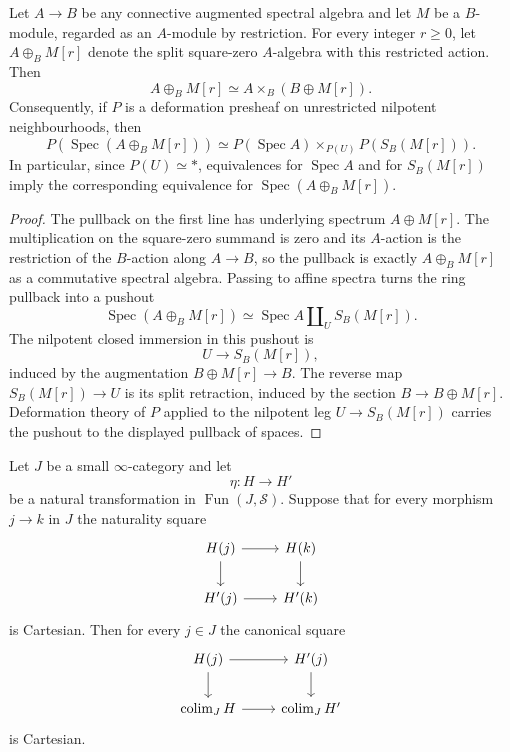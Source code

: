 \begin{lemma}
\label{lem:bnli-split-coefficient-base-change}
Let $A\to B$ be any connective augmented spectral algebra and let $M$ be a
$B$-module, regarded as an $A$-module by restriction.  For every integer
$r\geq0$, let $A\oplus_BM[r]$ denote the split square-zero $A$-algebra with
this restricted action.  Then
\[
\boxed{
    A\oplus_BM[r]
    \simeq
    A\times_B(B\oplus M[r]).}
\]
Consequently, if $P$ is a deformation presheaf on unrestricted nilpotent
neighbourhoods, then
\[
\boxed{
    P(\operatorname{Spec}(A\oplus_BM[r]))
    \simeq
    P(\operatorname{Spec}A)
    \times_{P(U)}
    P(S_B(M[r])).}
\]
In particular, since $P(U)\simeq *$, equivalences for
$\operatorname{Spec}A$ and for $S_B(M[r])$ imply the corresponding
equivalence for $\operatorname{Spec}(A\oplus_BM[r])$.
\end{lemma}

\begin{proof}
The pullback on the first line has underlying spectrum $A\oplus M[r]$.
The multiplication on the square-zero summand is zero and its $A$-action is
the restriction of the $B$-action along $A\to B$, so the pullback is exactly
$A\oplus_BM[r]$ as a commutative spectral algebra.  Passing to affine spectra
turns the ring pullback into a pushout
\[
    \operatorname{Spec}(A\oplus_BM[r])
    \simeq
    \operatorname{Spec}A
    \amalg_U
    S_B(M[r]).
\]
The nilpotent closed immersion in this pushout is
\[
    U\longrightarrow S_B(M[r]),
\]
induced by the augmentation $B\oplus M[r]\to B$.  The reverse map
$S_B(M[r])\to U$ is its split retraction, induced by the section
$B\to B\oplus M[r]$.  Deformation theory of $P$ applied to the nilpotent leg
$U\to S_B(M[r])$ carries the pushout to the displayed pullback of spaces.
\end{proof}

\begin{lemma}
\label{lem:bnli-cartesian-colimit-fibres}
Let $J$ be a small $\infty$-category and let
\[
    \eta:H\longrightarrow H'
\]
be a natural transformation in $\operatorname{Fun}(J,\mathcal S)$.  Suppose
that for every morphism $j\to k$ in $J$ the naturality square
\[
\begin{tikzcd}
H(j) \arrow[r] \arrow[d] & H(k) \arrow[d]\\
H'(j) \arrow[r] & H'(k)
\end{tikzcd}
\]
is Cartesian.  Then for every $j\in J$ the canonical square
\[
\begin{tikzcd}
H(j) \arrow[r] \arrow[d] & H'(j) \arrow[d]\\
\operatorname*{colim}_{J}H \arrow[r] &
\operatorname*{colim}_{J}H'
\end{tikzcd}
\]
is Cartesian.
\end{lemma}

